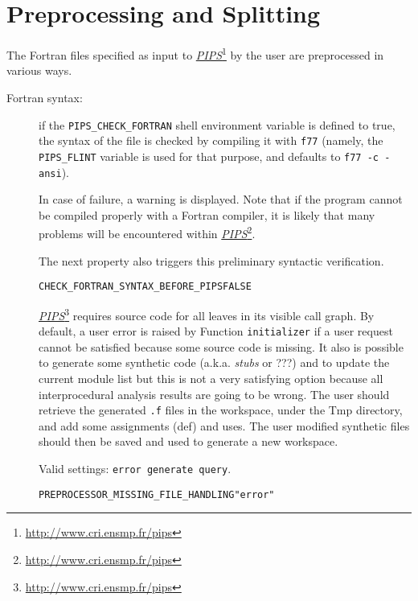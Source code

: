 \documentclass[a4paper]{report}
\newenvironment{PipsProp}{\begin{alltt}}{\end{alltt}}
\newcommand{\LINK}[2]{\href{#2}{#1}\footnote{\url{#2}}\xspace}
\newcommand{\PIPS}{\LINK{\emph{PIPS}}{http://www.cri.ensmp.fr/pips}}
\begin{document}
\section{Preprocessing and Splitting}
\label{subsection-preprocessing-and-splitting}

The Fortran files specified as input to \PIPS{} by the user are
preprocessed in various ways.

\begin{description}

\item[Fortran syntax:] if the \verb|PIPS_CHECK_FORTRAN| shell environment
  variable is defined to true, the syntax of the file is checked by
  compiling it with \verb|f77| (namely, the \verb|PIPS_FLINT| variable is
  used for that purpose, and defaults to \verb|f77 -c -ansi|).

  In case of failure, a warning is displayed. Note that if the program
  cannot be compiled properly with a Fortran compiler, it is likely that
  many problems will be encountered within \PIPS{}.

  The next property also triggers this preliminary syntactic verification.

\begin{PipsProp}
CHECK_FORTRAN_SYNTAX_BEFORE_PIPS FALSE
\end{PipsProp}

\PIPS{} requires source code for all leaves in its visible call graph. By
default, a user error is raised by Function \verb/initializer/ if a user
request cannot be satisfied because some source code is missing. It also
is possible to generate some synthetic code (a.k.a. {\em stubs} or ???)
and to update the current module list but this is not a very satisfying
option because all interprocedural analysis results are going to be wrong.
The user should retrieve the generated \verb/.f/ files in the workspace,
under the Tmp directory, and add some assignments (def) and uses. The user
modified synthetic files should then be saved and used to generate a new
workspace.

Valid settings: \verb|error generate query|.

\begin{PipsProp}
PREPROCESSOR_MISSING_FILE_HANDLING "error"
\end{PipsProp}


\end{description}
\end{document}
